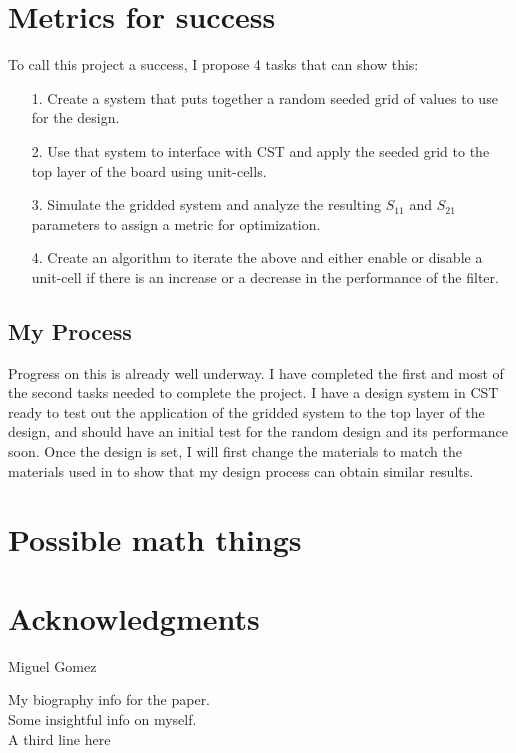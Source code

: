 \documentclass[journal]{IEEEtran}
\begin{document}
\section{Metrics for success}
To call this project a success, I propose 4 tasks that can show this:
\begin{itemize}
\item[1.] Create a system that puts together a random seeded grid of values to use for the design.
\item[2.] Use that system to interface with CST and apply the seeded grid to the top layer of the board using unit-cells.
\item[3.] Simulate the gridded system and analyze the resulting $S_{11}$ and $S_{21}$ parameters to assign a metric for optimization.
\item[4.] Create an algorithm to iterate the above and either enable or disable a unit-cell if there is an increase or a decrease in the performance of the filter.
\end{itemize}
\subsection{My Process}
Progress on this is already well underway. I have completed the first and most of the second tasks needed to complete the project. I have a design system in CST ready to test out the application of the gridded system to the top layer of the design, and should have an initial test for the random design and its performance soon. Once the design is set, I will first change the materials to match the materials used in \cite{wei_pixrf} to show that my design process can obtain similar results.
\newpage
\appendices
\section{Possible math things}
\section*{Acknowledgments}




\begin{IEEEbiography}{Miguel Gomez}

My biography info for the paper. \\ Some insightful info on myself. \\ A third line here

\end{IEEEbiography}
\end{document}
